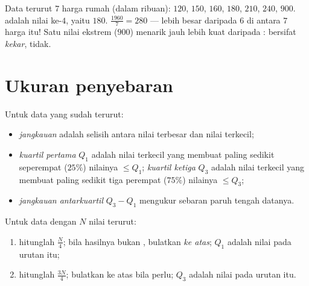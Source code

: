 \begin{example}\label{ex:g10:stats:median}
Data terurut $7$ harga rumah (dalam ribuan): $120$, $150$, $160$,
$180$, $210$, $240$, $900$.  adalah nilai ke-$4$, yaitu $180$.
 $\frac{1960}{7} = 280$ --- lebih besar daripada $6$ di antara $7$
harga itu! Satu nilai ekstrem ($900$) menarik  jauh lebih kuat
daripada :  bersifat \emph{kekar},  tidak.
\end{example}

\section{Ukuran penyebaran}

\begin{definition}\label{def:g10:stats:quartiles}
Untuk data yang sudah terurut:
\begin{itemize}
  \item \emph{jangkauan} adalah selisih antara nilai
        terbesar dan nilai terkecil;
  \item \emph{kuartil pertama} $Q_1$ adalah nilai terkecil
        yang membuat paling sedikit seperempat ($25\%$) nilainya
        $\leq Q_1$; \emph{kuartil ketiga} $Q_3$ adalah nilai terkecil
        yang membuat paling sedikit tiga perempat ($75\%$) nilainya
        $\leq Q_3$;
  \item \emph{jangkauan antarkuartil} $Q_3 - Q_1$ mengukur sebaran
        paruh tengah datanya.
\end{itemize}
\end{definition}

\begin{method}\label{met:g10:stats:quartiles}
Untuk data dengan $N$ nilai terurut:
\begin{enumerate}
  \item hitunglah $\frac N4$; bila hasilnya bukan , bulatkan
        \emph{ke atas}; $Q_1$ adalah nilai pada urutan itu;
  \item hitunglah $\frac{3N}{4}$; bulatkan ke atas bila perlu; $Q_3$ adalah
        nilai pada urutan itu.
\end{enumerate}
\end{method}

